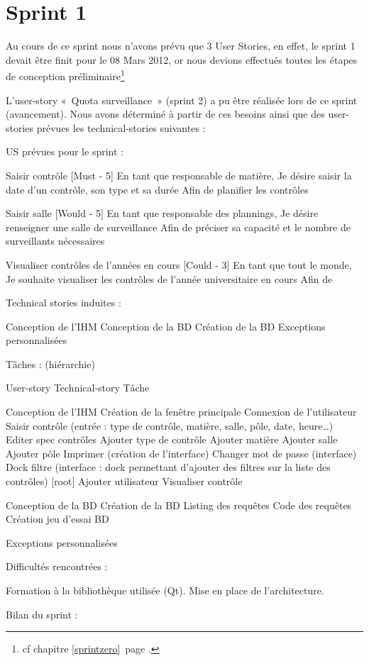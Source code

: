 \chapter{Sprint 1}
Au cours de ce sprint nous n'avons prévu que 3 User Stories, en effet, le sprint 1 devait être finit pour le 08 Mars 2012, or
nous devions effectués toutes les étapes de conception préliminaire\footnote{cf chapitre \ref{sprintzero} page \pageref{sprintzero}.} 





L'user-story « Quota surveillance » (sprint 2) a pu être réalisée lors de ce sprint (avancement).
Nous avons déterminé à partir de ces besoins ainsi que des user-stories prévues les technical-stories suivantes : 


US prévues pour le sprint : 

Saisir contrôle								[Must - 5]
En tant que		responsable de matière,
Je désire	saisir la date d'un contrôle, son type et sa durée
Afin de		planifier les contrôles



Saisir salle								[Would - 5]
En tant que		responsable des plannings, 
Je désire	renseigner une salle de surveillance
Afin de		préciser sa capacité et le nombre de surveillants nécessaires



Visualiser contrôles de l'années en cours				[Could - 3]
En tant que		tout le monde,
Je souhaite		visualiser les contrôles de l'année universitaire en cours
Afin de


Technical stories induites : 

Conception de l'IHM
Conception de la BD
Création de la BD
Exceptions personnalisées


Tâches : (hiérarchie)

User-story
Technical-story
Tâche


Conception de  l'IHM
Création de la fenêtre principale
Connexion de l'utilisateur
Saisir contrôle (entrée : type de contrôle, matière, salle, pôle, date, heure\ldots)
Editer spec contrôles
Ajouter type de contrôle
Ajouter matière
Ajouter salle
Ajouter pôle
Imprimer (création de l'interface)
Changer mot de passe (interface)
Dock filtre (interface : dock permettant d'ajouter des filtres sur la liste des contrôles)
[root] Ajouter utilisateur 
Visualiser contrôle

Conception de la BD
Création de la BD
Listing des requêtes
Code des requêtes
Création jeu d'essai BD

Exceptions personnalisées

Difficultés rencontrées :

Formation à la bibliothèque utilisée (Qt).
Mise en place de l'architecture.

Bilan du sprint :

